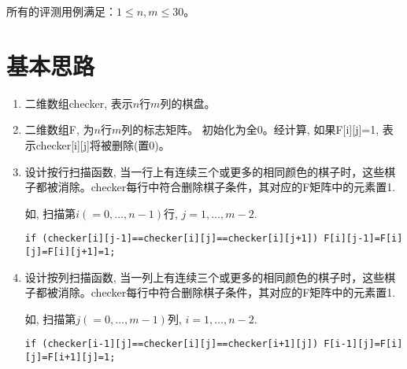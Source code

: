 所有的评测用例满足：$1 \le n, m \le 30$。

\section*{基本思路}

\begin{enumerate}
	\item 二维数组checker, 表示$n$行$m$列的棋盘。
	\item 二维数组F, 为$n$行$m$列的标志矩阵。 初始化为全0。经计算, 如果F[i][j]=1, 表示checker[i][j]将被删除(置0)。
	\item 设计按行扫描函数, 当一行上有连续三个或更多的相同颜色的棋子时，这些棋子都被消除。checker每行中符合删除棋子条件，其对应的F矩阵中的元素置1.  
	
	如, 扫描第$i(=0,\dots,n-1)$行, $j=1,\dots,m-2$.
	
	\lstinline|if (checker[i][j-1]==checker[i][j]==checker[i][j+1]) F[i][j-1]=F[i][j]=F[i][j+1]=1;|
	
	\item 设计按列扫描函数, 当一列上有连续三个或更多的相同颜色的棋子时，这些棋子都被消除。checker每行中符合删除棋子条件，其对应的F矩阵中的元素置1.  
	
	如, 扫描第$j(=0,\dots,m-1)$列, $i=1,\dots,n-2$.
	
	\lstinline|if (checker[i-1][j]==checker[i][j]==checker[i+1][j]) F[i-1][j]=F[i][j]=F[i+1][j]=1;|
\end{enumerate}


